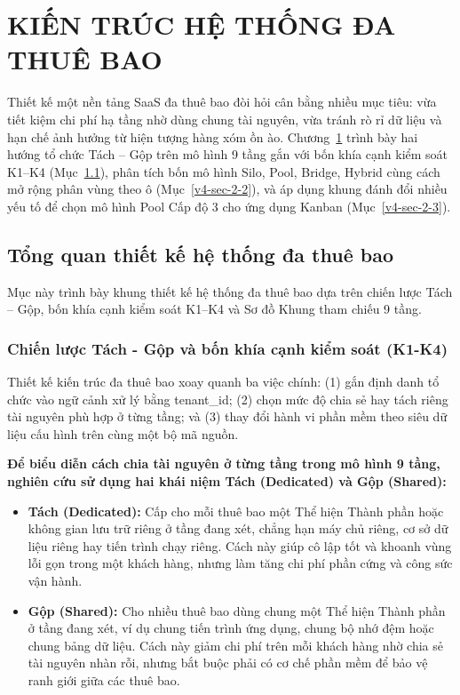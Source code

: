 \chapter{KIẾN TRÚC HỆ THỐNG ĐA THUÊ BAO}\label{v4-chapter-2}

Thiết kế một nền tảng SaaS đa thuê bao đòi hỏi cân bằng nhiều mục tiêu: vừa tiết kiệm chi phí hạ tầng nhờ dùng chung tài nguyên, vừa tránh rò rỉ dữ liệu và hạn chế ảnh hưởng từ hiện tượng hàng xóm ồn ào. Chương~\ref{v4-chapter-2} trình bày hai hướng tổ chức Tách -- Gộp trên mô hình 9 tầng gắn với bốn khía cạnh kiểm soát K1--K4 (Mục~\ref{v4-sec-2-1}), phân tích bốn mô hình Silo, Pool, Bridge, Hybrid cùng cách mở rộng phân vùng theo ô (Mục~\ref{v4-sec-2-2}), và áp dụng khung đánh đổi nhiều yếu tố để chọn mô hình Pool Cấp độ 3 cho ứng dụng Kanban (Mục~\ref{v4-sec-2-3}).

\section{Tổng quan thiết kế hệ thống đa thuê bao}\label{v4-sec-2-1}

Mục này trình bày khung thiết kế hệ thống đa thuê bao dựa trên chiến lược Tách -- Gộp, bốn khía cạnh kiểm soát K1--K4 và Sơ đồ Khung tham chiếu 9 tầng.

\subsection{Chiến lược Tách - Gộp và bốn khía cạnh kiểm soát (K1-K4)}\label{v4-sec-2-1-1}

Thiết kế kiến trúc đa thuê bao xoay quanh ba việc chính: (1) gắn định danh tổ chức vào ngữ cảnh xử lý bằng tenant\_\allowbreak{}id; (2) chọn mức độ chia sẻ hay tách riêng tài nguyên phù hợp ở từng tầng; và (3) thay đổi hành vi phần mềm theo siêu dữ liệu cấu hình trên cùng một bộ mã nguồn.

\textbf{Để biểu diễn cách chia tài nguyên ở từng tầng trong mô hình 9 tầng, nghiên cứu sử dụng hai khái niệm Tách (Dedicated) và Gộp (Shared):}

\begin{itemize}
\item
  \textbf{Tách (Dedicated):} Cấp cho mỗi thuê bao một Thể hiện Thành phần hoặc không gian lưu trữ riêng ở tầng đang xét, chẳng hạn máy chủ riêng, cơ sở dữ liệu riêng hay tiến trình chạy riêng. Cách này giúp cô lập tốt và khoanh vùng lỗi gọn trong một khách hàng, nhưng làm tăng chi phí phần cứng và công sức vận hành.
\item
  \textbf{Gộp (Shared):} Cho nhiều thuê bao dùng chung một Thể hiện Thành phần ở tầng đang xét, ví dụ chung tiến trình ứng dụng, chung bộ nhớ đệm hoặc chung bảng dữ liệu. Cách này giảm chi phí trên mỗi khách hàng nhờ chia sẻ tài nguyên nhàn rỗi, nhưng bắt buộc phải có cơ chế phần mềm để bảo vệ ranh giới giữa các thuê bao.
\end{itemize}

